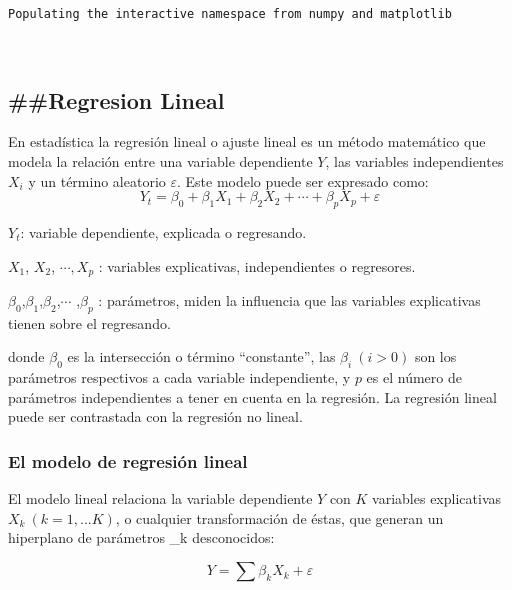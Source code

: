 \documentclass{article}
\begin{document}
    \begin{Verbatim}[commandchars=\\\{\}]
Populating the interactive namespace from numpy and matplotlib
    \end{Verbatim}

    \begin{center}
    \end{center}
    { \hspace*{\fill} \\}
    
    \subsection{\#\#Regresion Lineal}\label{regresion-lineal}

En estadística la regresión lineal o ajuste lineal es un método
matemático que modela la relación entre una variable dependiente $Y$,
las variables independientes $X_i$ y un término aleatorio $\varepsilon$.
Este modelo puede ser expresado como: \[
Y_t = \beta_0  + \beta_1 X_1 + \beta_2 X_2 +  \cdots +\beta_p X_p + \varepsilon
\]

$Y_t$: variable dependiente, explicada o regresando.

$X_1$, $X_2$, $\cdots, X_p$ : variables explicativas, independientes o
regresores.

$\beta_0$,$\beta_1$,$\beta_2$,$\cdots$ ,$\beta_p$ : parámetros, miden la
influencia que las variables explicativas tienen sobre el regresando.

donde $\beta_0$ es la intersección o término ``constante'', las
$\beta_i \ (i > 0)$ son los parámetros respectivos a cada variable
independiente, y $p$ es el número de parámetros independientes a tener
en cuenta en la regresión. La regresión lineal puede ser contrastada con
la regresión no lineal.

\subsubsection{El modelo de regresión
lineal}\label{el-modelo-de-regresiuxf3n-lineal}

El modelo lineal relaciona la variable dependiente $Y$ con $K$ variables
explicativas $X_k \ (k = 1,...K)$, o cualquier transformación de éstas,
que generan un hiperplano de parámetros \beta\_k desconocidos:

\begin{equation}
 Y = \sum \beta_k X_k + \varepsilon
\end{equation}
\end{document}
